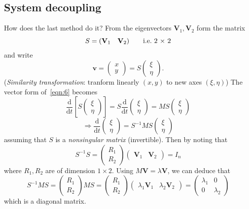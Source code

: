 \documentclass[12pt]{report}
\theoremstyle{definition}
\begin{document}
\subsection{System decoupling}
How does the last method do it? From the eigenvectors $\mathbf{V}_1, \mathbf{V}_2$ form the matrix\[
    S = (\mathbf{V}_1 \quad \mathbf{V}_2) \qquad\textnormal{i.e.\ 2 $\times$ 2}
\]and write \[\mathbf{v} = \begin{pmatrix}
        x \\
        y
    \end{pmatrix} = S\begin{pmatrix}
            \xi \\
            \eta
    \end{pmatrix}.
\](\emph{Similarity transformation}: tranform linearly $(x,y)$ to new axes $(\xi, \eta)$)
The vector form of~\eqref{eqn:6} becomes\[
    \frac{\mathrm{d}}{\mathrm{d}t} \left[S \begin{pmatrix}
            \xi \\
            \eta
    \end{pmatrix} \right] 
    = S\frac{\mathrm{d}}{\mathrm{d}t} \begin{pmatrix}
            \xi \\
            \eta
    \end{pmatrix} 
    = MS\begin{pmatrix}
            \xi \\
            \eta
    \end{pmatrix} 
\]\[
    \Rightarrow{}\frac{\mathrm{d}}{\mathrm{d}t} \begin{pmatrix}
            \xi \\
            \eta
    \end{pmatrix} = S^{-1}MS\begin{pmatrix}
            \xi \\
            \eta
    \end{pmatrix} 
\]assuming that $S$ is a \emph{nonsingular matrix} (invertible).  
Then by noting that\[
    S^{-1}S = \begin{pmatrix}
            R_1 \\
            R_2
    \end{pmatrix} \begin{pmatrix}
    \mathbf{V}_1 & \mathbf{V}_2
    \end{pmatrix} = I_n
\]where $R_1, R_2$ are of dimension $1 \times 2$.
Using $M\mathbf{V} = \lambda \mathbf{V}$, we can deduce that\[
    S^{-1}MS = \begin{pmatrix}
            R_1 \\
            R_2
    \end{pmatrix} MS = \begin{pmatrix}
            R_1 \\
            R_2
    \end{pmatrix} \begin{pmatrix}
    \lambda_1 \mathbf{V}_1 & \lambda_2 \mathbf{V}_2
    \end{pmatrix} = \begin{pmatrix}
    \lambda_1 & 0 \\
    0 & \lambda_2
    \end{pmatrix} 
\]which is a diagonal matrix. 
\end{document}
